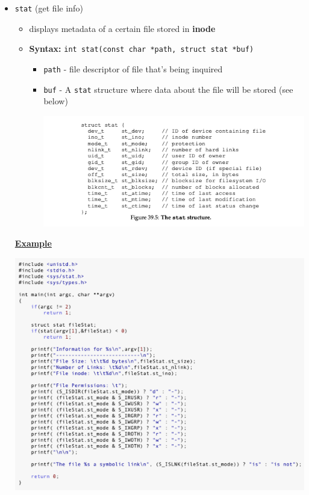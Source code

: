 \documentclass[12pt]{article}
\begin{document}
\begin{itemize}
    \item \texttt{stat} (get file info)

    \begin{itemize}
        \item displays metadata of a certain file stored in \textbf{inode}
        \item \textbf{Syntax:} \texttt{int stat(const char *path, struct stat *buf)}

        \begin{itemize}
            \item \texttt{path} - file descriptor of file that's being inquired
            \item \texttt{buf} - A \texttt{stat} structure where data about the file will be stored (see below)

            \bigskip

            \begin{center}
            \includegraphics[width=\linewidth]{../images/midterm_4_solution_9.png}
            \end{center}
        \end{itemize}
    \end{itemize}

    \bigskip

    \underline{\textbf{Example}}

    \begin{center}
    \includegraphics[width=\linewidth]{../images/midterm_4_solution_10.png}
    \end{center}


\end{itemize}
\end{document}
